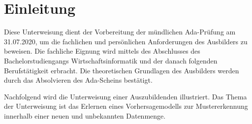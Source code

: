 \acresetall 

\chapter{Einleitung}
Diese Unterweisung dient der Vorbereitung der mündlichen Ada-Prüfung am 31.07.2020, um die fachlichen und persönlichen Anforderungen des Ausbilders zu beweisen. Die fachliche Eignung wird mittels des Abschlusses des Bachelorstudiengangs Wirtschaftsinformatik und der danach folgenden Berufstätigkeit erbracht. Die theoretischen Grundlagen des Ausbilders werden durch das Absolvieren des Ada-Scheins bestätigt. 
\par
Nachfolgend wird die Unterweisung einer Auszubildenden illustriert. Das Thema der Unterweisung ist das Erlernen eines Vorhersagemodells zur Mustererkennung innerhalb einer neuen und unbekannten Datenmenge. 


